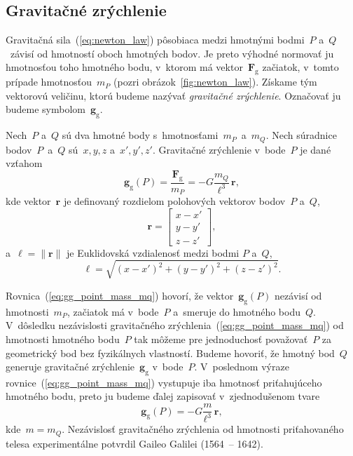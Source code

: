 \documentclass[a4paper, 12pt]{book}
\newcommand{\gidx}{\mathrm g}
\let\vec\mathbf
\begin{document}
\subsection{Gravitačné zrýchlenie}
\label{sec:gg}

Gravitačná sila~(\ref{eq:newton_law}) pôsobiaca medzi hmotnými bodmi~$P$ 
a~$Q$~závisí od hmotností oboch hmotných bodov.  Je preto výhodné normovať ju 
hmotnosťou toho hmotného bodu, v~ktorom má vektor~$\vec F_\gidx$ začiatok, 
v~tomto prípade hmotnosťou~$m_P$ (pozri obrázok~\ref{fig:newton_law}).  Získame 
tým vektorovú veličinu, ktorú budeme nazývať \emph{gravitačné zrýchlenie}.  
Označovať ju budeme symbolom~$\vec g_\gidx$.

Nech~$P$ a~$Q$ sú dva hmotné body s~hmotnosťami~$m_P$~a~$m_Q$.  Nech súradnice 
bodov~$P$~a~$Q$ sú~$x, y, z$ a~$x', y', z'$.  Gravitačné zrýchlenie v~bode~$P$ 
je dané vzťahom
%
\begin{equation}
\label{eq:gg_point_mass_mq}
\vec g_\gidx(P) = \frac{\vec F_\gidx}{m_P} = -G \frac{m_Q}{\ell^3} \, 
\vec{r}{,}
\end{equation}
%
kde vektor~$\vec r$ je definovaný rozdielom polohových vektorov bodov~$P$ 
a~$Q$,
%
\begin{equation}
\label{eq:r}
\vec r =
%
\begin{bmatrix}
x - x'\\
y - y'\\
z - z'
\end{bmatrix}
{,}
\end{equation}
%
a~$\ell = \| \vec r \|$ je Euklidovská vzdialenosť medzi bodmi $P$ a~$Q$,
%
\begin{equation}
\label{eq:l}
\ell = \sqrt{(x - x')^2 + (y - y')^2 + (z - z')^2}{.}
\end{equation}

Rovnica~(\ref{eq:gg_point_mass_mq}) hovorí, že vektor~$\vec g_\gidx(P)$ 
nezávisí od hmotnosti~$m_P$, začiatok má v~bode~$P$ a~smeruje do hmotného 
bodu~$Q$.  V~dôsledku nezávislosti gravitačného 
zrýchlenia~(\ref{eq:gg_point_mass_mq}) od hmotnosti hmotného bodu~$P$ tak 
môžeme pre jednoduchosť považovať~$P$ za geometrický bod bez fyzikálnych 
vlastností.  Budeme hovoriť, že hmotný bod~$Q$ generuje gravitačné 
zrýchlenie~$\vec g_\gidx$ v~bode~$P$.  V~poslednom výraze 
rovnice~(\ref{eq:gg_point_mass_mq}) vystupuje iba hmotnosť priťahujúceho 
hmotného bodu, preto ju budeme ďalej zapisovať v~zjednodušenom tvare
%
\begin{equation}
\label{eq:gg_point_mass}
\vec g_\gidx(P) = -G \frac{m}{\ell^3} \, \vec{r}{,}
\end{equation}
%
kde~$m = m_Q$.  Nezávislosť gravitačného zrýchlenia od hmotnosti priťahovaného 
telesa experimentálne potvrdil Gaileo Galilei (1564~-- 1642).
\end{document}
